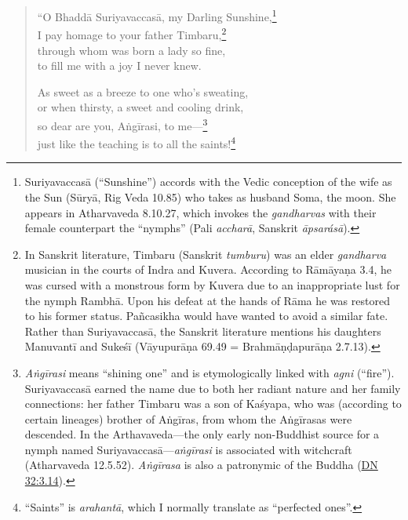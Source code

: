 \documentclass[12pt,openany]{book}%
\begin{document}
\begin{verse}%
“O \textsanskrit{Bhaddā} \textsanskrit{Suriyavaccasā}, my Darling Sunshine,\footnote{\textsanskrit{Suriyavaccasā} (“Sunshine”) accords with the Vedic conception of the wife as the Sun (\textsanskrit{Sūryā}, Rig Veda 10.85) who takes as husband Soma, the moon. She appears in Atharvaveda 8.10.27, which invokes the \textit{gandharvas} with their female counterpart the “nymphs” (Pali \textit{\textsanskrit{accharā}}, Sanskrit \textit{\textsanskrit{āpsarásā}}). } \\
I pay homage to your father Timbaru,\footnote{In Sanskrit literature, Timbaru (Sanskrit \textit{tumburu}) was an elder \textit{gandharva} musician in the courts of Indra and Kuvera. According to \textsanskrit{Rāmāyaṇa} 3.4, he was cursed with a monstrous form by Kuvera due to an inappropriate lust for the nymph \textsanskrit{Rambhā}. Upon his defeat at the hands of \textsanskrit{Rāma} he was restored to his former status. \textsanskrit{Pañcasikha} would have wanted to avoid a similar fate. Rather than \textsanskrit{Suriyavaccasā}, the Sanskrit literature mentions his daughters \textsanskrit{Manuvantī} and \textsanskrit{Sukeśī} (\textsanskrit{Vāyupurāṇa} 69.49 = \textsanskrit{Brahmāṇḍapurāṇa} 2.7.13). } \\
through whom was born a lady so fine, \\
to fill me with a joy I never knew. 

As sweet as a breeze to one who’s sweating, \\
or when thirsty, a sweet and cooling drink, \\
so dear are you, \textsanskrit{Aṅgīrasi}, to me—\footnote{\textit{\textsanskrit{Aṅgīrasi}} means “shining one” and is etymologically linked with \textit{agni} (“fire”). \textsanskrit{Suriyavaccasā} earned the name due to both her radiant nature and her family connections: her father Timbaru was a son of \textsanskrit{Kaśyapa}, who was (according to certain lineages) brother of \textsanskrit{Aṅgīras}, from whom the \textsanskrit{Aṅgīrasas} were descended. In the Arthavaveda—the only early non-Buddhist source for a nymph named \textsanskrit{Suriyavaccasā}—\textit{\textsanskrit{aṅgīrasi}} is associated with witchcraft (Atharvaveda 12.5.52). \textit{\textsanskrit{Aṅgīrasa}} is also a patronymic of the Buddha (\href{https://suttacentral.net/dn32/en/sujato\#3.14}{DN 32:3.14}). } \\
just like the teaching is to all the saints!\footnote{“Saints” is \textit{\textsanskrit{arahantā}}, which I normally translate as “perfected ones”. } 


\end{verse}
\end{document}
